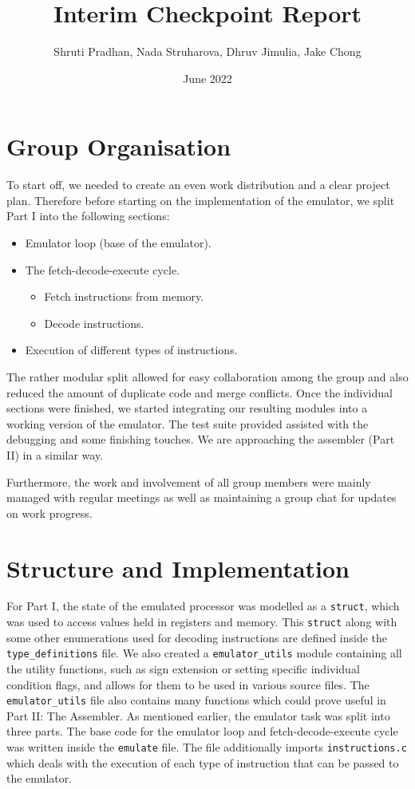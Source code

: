 \documentclass[12pt, letterpaper]{article}
\title{Interim Checkpoint Report}
\author{Shruti Pradhan, Nada Struharova, Dhruv Jimulia, Jake Chong }
\date{June 2022}
\begin{document}
\maketitle

\section{Group Organisation}
To start off, we needed to create an even work distribution and a clear project plan. Therefore before starting on the implementation of the emulator, we split Part I into the following sections:
\begin{itemize}
  \item Emulator loop (base of the emulator).
  \item The fetch-decode-execute cycle.
  \begin{itemize}
      \item Fetch instructions from memory.
      \item Decode instructions.
  \end{itemize}
  \item Execution of different types of instructions.
\end{itemize}
The rather modular split allowed for easy collaboration among the group and also reduced the amount of duplicate code and merge conflicts. Once the individual sections were finished, we started integrating our resulting modules into a working version of the emulator. The test suite provided assisted with the debugging and some finishing touches. We are approaching the assembler (Part II) in a similar way.

Furthermore, the work and involvement of all group members were mainly managed with regular meetings as well as maintaining a group chat for updates on work progress.

\section{Structure and Implementation}
For Part I, the state of the emulated processor was modelled as a \verb|struct|, which was used to access values held in registers and memory. This \verb|struct| along with some other enumerations used for decoding instructions are defined inside the \verb|type_definitions| file. We also created a \verb|emulator_utils| module containing all the utility functions, such as sign extension or setting specific individual condition flags, and allows for them to be used in various source files. The \verb|emulator_utils| file also contains many functions which could prove useful in Part II: The Assembler. As mentioned earlier, the emulator task was split into three parts. The base code for the emulator loop and fetch-decode-execute cycle was written inside the \verb|emulate| file. The file additionally imports \verb|instructions.c| which deals with the execution of each type of instruction that can be passed to the emulator.
\end{document}
